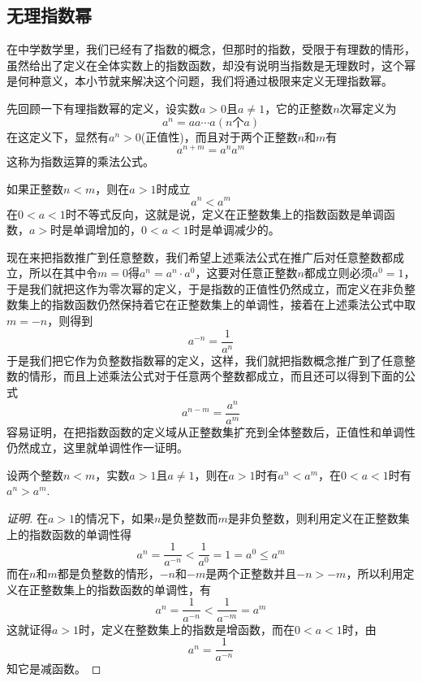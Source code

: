 \subsection{无理指数幂}
\label{sec:irrational-power}

在中学数学里，我们已经有了指数的概念，但那时的指数，受限于有理数的情形，虽然给出了定义在全体实数上的指数函数，却没有说明当指数是无理数时，这个幂是何种意义，本小节就来解决这个问题，我们将通过极限来定义无理指数幂。

先回顾一下有理指数幂的定义，设实数$a>0$且$a \neq 1$，它的正整数$n$次幂定义为
\[ a^n = aa\cdots a(n\text{个}a) \]
在这定义下，显然有$a^n>0$(正值性)，而且对于两个正整数$n$和$m$有
\begin{equation}
  \label{eq:exponent-multiple-rule-with-positive-integer}
  a^{n+m}=a^na^m
\end{equation}
这称为指数运算的乘法公式。

如果正整数$n<m$，则在$a>1$时成立
\[ a^n<a^m \]
在$0<a<1$时不等式反向，这就是说，定义在正整数集上的指数函数是单调函数，$a>$时是单调增加的，$0<a<1$时是单调减少的。

现在来把指数推广到任意整数，我们希望上述乘法公式在推广后对任意整数都成立，所以在其中令$m=0$得$a^n=a^n \cdot a^0$，这要对任意正整数$n$都成立则必须$a^0=1$，于是我们就把这作为零次幂的定义，于是指数的正值性仍然成立，而定义在非负整数集上的指数函数仍然保持着它在正整数集上的单调性，接着在上述乘法公式中取$m=-n$，则得到
\[ a^{-n} = \frac{1}{a^n} \]
于是我们把它作为负整数指数幂的定义，这样，我们就把指数概念推广到了任意整数的情形，而且上述乘法公式对于任意两个整数都成立，而且还可以得到下面的公式
\[ a^{n-m} = \frac{a^n}{a^m} \]
容易证明，在把指数函数的定义域从正整数集扩充到全体整数后，正值性和单调性仍然成立，这里就单调性作一证明。
\begin{theorem}
  设两个整数$n<m$，实数$a>1$且$a \neq 1$，则在$a>1$时有$a^n<a^m$，在$0<a<1$时有$a^n>a^m$.
\end{theorem}

\begin{proof}[证明]
  在$a>1$的情况下，如果$n$是负整数而$m$是非负整数，则利用定义在正整数集上的指数函数的单调性得
  \[ a^n = \frac{1}{a^{-n}} < \frac{1}{a^0} = 1 = a^0 \leqslant a^m \]
  而在$n$和$m$都是负整数的情形，$-n$和$-m$是两个正整数并且$-n>-m$，所以利用定义在正整数集上的指数函数的单调性，有
  \[ a^n = \frac{1}{a^{-n}} < \frac{1}{a^{-m}} = a^m \]
  这就证得$a>1$时，定义在整数集上的指数是增函数，而在$0<a<1$时，由
  \[ a^n = \frac{1}{a^{-n}} \]
  知它是减函数。
\end{proof}

